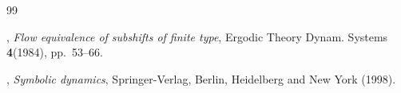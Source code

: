 \documentclass[11pt]{article}
\theoremstyle{plain}
\theoremstyle{definition}
\numberwithin{equation}{section}
\begin{document}
\begin{thebibliography}{99}


%

,
{\it Flow equivalence of subshifts of finite type},
Ergodic Theory Dynam. Systems {\bf 4}(1984), pp.\ 53--66.



















,
{\it Symbolic dynamics}, 
Springer-Verlag, Berlin, Heidelberg and New York (1998).




\end{thebibliography}
\end{document}
